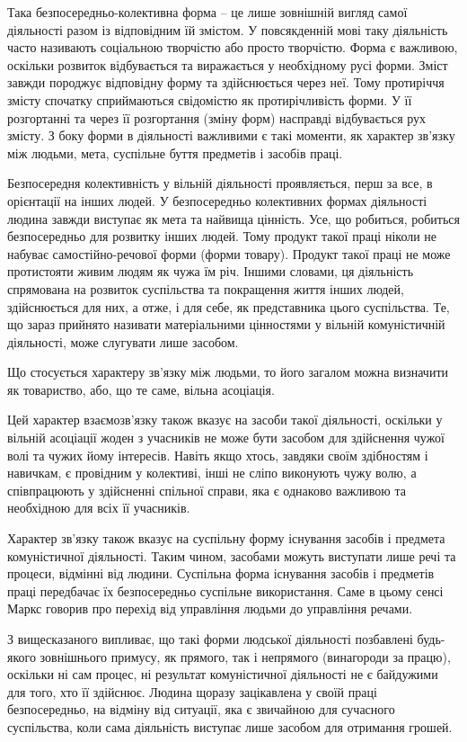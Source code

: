 \documentclass[12pt,a4paper,openany]{book}
\begin{document}
Така безпосередньо-колективна форма – це лише зовнішній вигляд самої діяльності разом із відповідним їй змістом. У повсякденній мові таку діяльність часто називають соціальною творчістю або просто творчістю. Форма є важливою, оскільки розвиток відбувається та виражається у необхідному русі форми. Зміст завжди породжує відповідну форму та здійснюється через неї. Тому протиріччя змісту спочатку сприймаються свідомістю як протирічливість форми. У її розгортанні та через її розгортання (зміну форм) насправді відбувається рух змісту. З боку форми в діяльності важливими є такі моменти, як характер зв’язку між людьми, мета, суспільне буття предметів і засобів праці.

Безпосередня колективність у вільній діяльності проявляється, перш за все, в орієнтації на інших людей. У безпосередньо колективних формах діяльності людина завжди виступає як мета та найвища цінність. Усе, що робиться, робиться безпосередньо для розвитку інших людей. Тому продукт такої праці ніколи не набуває самостійно-речової форми (форми товару). Продукт такої праці не може протистояти живим людям як чужа їм річ. Іншими словами, ця діяльність спрямована на розвиток суспільства та покращення життя інших людей, здійснюється для них, а отже, і для себе, як представника цього суспільства. Те, що зараз прийнято називати матеріальними цінностями у вільній комуністичній діяльності, може слугувати лише засобом.

Що стосується характеру зв’язку між людьми, то його загалом можна визначити як товариство, або, що те саме, вільна асоціація.

Цей характер взаємозв’язку також вказує на засоби такої діяльності, оскільки у вільній асоціації жоден з учасників не може бути засобом для здійснення чужої волі та чужих йому інтересів. Навіть якщо хтось, завдяки своїм здібностям і навичкам, є провідним у колективі, інші не сліпо виконують чужу волю, а співпрацюють у здійсненні спільної справи, яка є однаково важливою та необхідною для всіх її учасників.

Характер зв’язку також вказує на суспільну форму існування засобів і предмета комуністичної діяльності. Таким чином, засобами можуть виступати лише речі та процеси, відмінні від людини. Суспільна форма існування засобів і предметів праці передбачає їх безпосередньо суспільне використання. Саме в цьому сенсі Маркс говорив про перехід від управління людьми до управління речами.

З вищесказаного випливає, що такі форми людської діяльності позбавлені будь-якого зовнішнього примусу, як прямого, так і непрямого (винагороди за працю), оскільки ні сам процес, ні результат комуністичної діяльності не є байдужими для того, хто її здійснює. Людина щоразу зацікавлена у своїй праці безпосередньо, на відміну від ситуації, яка є звичайною для сучасного суспільства, коли сама діяльність виступає лише засобом для отримання грошей.
\end{document}
